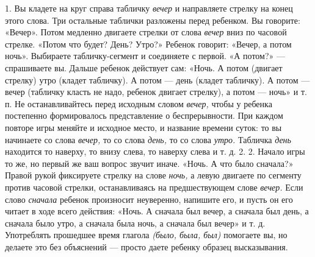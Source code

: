 \documentclass[a5paper]{book}
\renewcommand{\emph}[1]{\textit{#1}}
\begin{document}
1. Вы кладете на круг справа табличку \emph{вечер} и направляете стрелку
на конец этого слова. Три остальные таблички разложены перед ребенком.
Вы говорите: «Вечер». Потом медленно двигаете стрелки от слова
\emph{вечер} вниз по часовой стрелке. «Потом что будет? День? Утро?»
Ребенок говорит: «Вечер, а потом ночь». Выбираете табличку-сегмент и
соединяете с первой. «А потом?» --- спрашиваете вы. Дальше ребенок
действует сам: «Ночь. А потом (двигает стрелку) утро (кладет табличку).
А потом --- день (кладет табличку). А потом --- вечер (табличку класть
не надо, ребенок двигает стрелку), а потом --- ночь» и т. п. Не
останавливайтесь перед исходным словом \emph{вечер,} чтобы у ребенка
постепенно формировалось представление о беспрерывности. При каждом
повторе игры меняйте и исходное место, и название времени суток: то вы
начинаете со слова \emph{вечер,} то со слова \emph{день,} то со слова
\emph{утро.} Табличка \emph{день} находится то наверху, то внизу слева,
то наверху слева и т. д. 2. 2. Начало игры то же, но первый же ваш
вопрос звучит иначе. «Ночь. А что было сначала?» Правой рукой фиксируете
стрелку на слове \emph{ночь,} а левую двигаете по сегменту против
часовой стрелки, останавливаясь на предшествующем слове \emph{вечер.}
Если слово \emph{сначала} ребенок произносит неуверенно, напишите его, и
пусть он его читает в ходе всего действия: «Ночь. А сначала был вечер, а
сначала был день, а сначала было утро, а сначала была ночь, а сначала
был вечер» и т. д. Употреблять прошедшее время глагола \emph{(было,
была, был)} помогаете вы, но делаете это без объяснений --- просто даете
ребенку образец высказывания.
\end{document}
